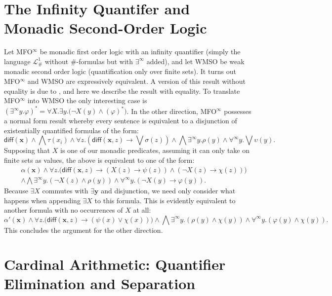 \documentclass[12pt,oneside,reqno]{amsart}
\theoremstyle{definition}
\begin{document}
\section{The Infinity Quantifer and Monadic Second-Order Logic} \label{app:infinityquantifier}
Let \textsf{MFO}$^\infty$ be monadic first order logic with an infinity quantifier (simply the language $\mathcal{L}_\#^1$ without $\#$-formulas but with $\exists^\infty$ added), and let \textsf{WMSO} be weak monadic second order logic (quantification only over finite sets). It turns out \textsf{MFO}$^\infty$ and \textsf{WMSO} are expressively equivalent. A version of this result without equality is due to \cite{Vaananen}, and here we describe the result with equality. To translate \textsf{MFO}$^\infty$ into \textsf{WMSO} the only interesting case is $(\exists^\infty y. \varphi)^* = \forall X.\exists y.\big(\neg X(y) \wedge (\varphi)^*\big)$. In the other direction, \textsf{MFO}$^\infty$ possesses a normal form result \citep[Thm 3.15]{Carreiro} whereby every sentence is equivalent to a disjunction of existentially quantified formulas of the form: $$\mathsf{diff}(\mathbf{x}) \wedge \bigwedge \tau(x_i) \wedge \forall z. (\mathsf{diff}(\mathbf{x},z) \rightarrow \bigvee \sigma(z)) \wedge \bigwedge \exists^\infty y.\rho(y) \wedge \forall^\infty y. \bigvee \upsilon(y).$$ Supposing that $X$ is one of our monadic predicates, assuming it can only take on finite sets as values, the above is equivalent to one of the form: \begin{eqnarray*} & & \alpha(\mathbf{x}) \wedge \forall z. \big(\mathsf{diff}(\mathbf{x},z) \rightarrow (X(z) \rightarrow \psi(z)) \wedge (\neg X(z) \rightarrow \chi(z))\big) \\
& & \wedge \bigwedge \exists^\infty y.(\neg X(z) \wedge \rho(y)) \wedge \forall^\infty y. (\neg X(y) \rightarrow \varphi(y)). \end{eqnarray*} Because $\exists X$ commutes with $\exists \mathbf{y}$ and disjunction, we need only consider what happens when appending $\exists X$ to this formula. This is evidently equivalent to another formula with no occurrences of $X$ at all: $$\alpha'(\mathbf{x}) \wedge \forall z. \big(\mathsf{diff}(\mathbf{x},z) \rightarrow (\psi(x) \vee \chi(x))\big) \wedge \bigwedge \exists^\infty y.(\rho(y) \wedge \chi(y)) \wedge \forall^\infty y.(\varphi(y) \wedge \chi(y)).$$ This concludes the argument for the other direction. 


\section{Cardinal Arithmetic: Quantifier Elimination and Separation} \label{app:infinityaddition}
\end{document}
